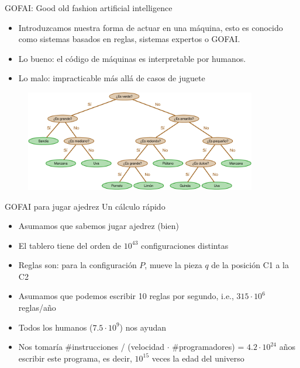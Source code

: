 \documentclass[9pt]{beamer}
\begin{document}
\begin{frame}{GOFAI: Good old fashion artificial intelligence}
  \begin{itemize}
    \item Introduzcamos nuestra forma de actuar en una máquina, esto es conocido como sistemas basados en reglas, sistemas expertos o GOFAI.
    \item Lo bueno: el código de máquinas es interpretable por humanos. 
    \item Lo malo: impracticable más allá de casos de juguete
  \end{itemize}
  \begin{figure}
    \centering
    \includegraphics[width=0.9\textwidth]{../img/cap0_arbol}
  \end{figure}
\end{frame}

\begin{frame}{GOFAI para jugar ajedrez}
Un cálculo rápido
  \begin{itemize}
    \item Asumamos que sabemos jugar ajedrez (bien)
    \item El tablero tiene del orden de $10^{43}$ configuraciones distintas
    \item Reglas son: para la configuración $P$, mueve la pieza $q$ de la posición C1 a la C2
    \item Asumamos que podemos escribir 10 reglas por segundo, i.e., $315\cdot 10^{6}$ reglas/año
    \item Todos los humanos ($7.5\cdot10^9$) nos ayudan
    \item Nos tomaría \#instrucciones / (velocidad $\cdot$ \#programadores) = $4.2\cdot 10^{24}$ años escribir este programa, es decir, $10^{15}$ veces la edad del universo
  \end{itemize}

  \begin{figure}
    \centering
  \end{figure}
\end{frame}
\end{document}
